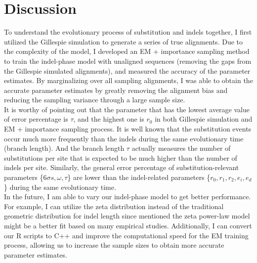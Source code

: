 \section{Discussion}
To understand the evolutionary process of substitution and indels together, I first utilized the Gillespie simulation to generate a series of true alignments. Due to the complexity of the model, I developed an EM + importance sampling method to train the indel-phase model with unaligned sequences (removing the gaps from the Gillespie simulated alignments), and measured the accuracy of the parameter estimates. By marginalizing over all sampling alignments, I was able to obtain the accurate parameter estimates by greatly removing the alignment bias and reducing the sampling variance through a large sample size.  \\ 
\indent It is worthy of pointing out that the parameter that has the lowest average value of error percentage is  $\tau$, and the highest one is $r_0$  in both Gillespie simulation and EM + importance sampling process. It is well known that the substitution events occur much more frequently than the indels during the same evolutionary time (branch length). And the branch length $\tau$ actually measures the number of substitutions per site that is expected to be much higher than the number of indels per site. Similarly, the general error percentage of substitution-relevant parameters \{$6\sigma s, \omega, \tau $\} are lower than the indel-related parameters \{$r_0, r_1, r_2,  e_i, e_d $\} during the same evolutionary time. \\
\indent In the future, I am able to vary our indel-phase model to get better performance. For example, I can utilize the zeta distribution instead of the traditional geometric distribution for indel length since \citeauthor{cartwright2009problems} mentioned the zeta power-law model might be a better fit based on many empirical studies. Additionally, I can convert our R scripts to C++ and improve the computational speed for the EM training process, allowing us to increase the sample sizes to obtain more accurate parameter estimates.   







%
%


